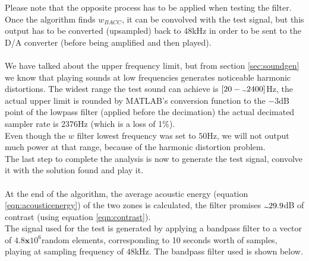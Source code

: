 Please note that the opposite process has to be applied when testing the filter. Once the algorithm finds $w_{BACC}$, it can be convolved with the test signal, but this output has to be converted (upsampled) back to $48$kHz in order to be sent to the D/A converter (before being amplified and then played).
\\
\\
We have talked about the upper frequency limit, but from section \ref{sec:soundgen} we know that playing sounds at low frequencies generates noticeable harmonic distortions. The widest range the test sound can achieve is $[20-\tld 2400]$Hz, the actual upper limit is rounded by MATLAB's conversion function to the $-3$dB point of the lowpass filter (applied before the decimation) the actual decimated sampler rate is $2376$Hz (which is a loss of 1\%).
\\
Even though the $w$ filter lowest frequency was set to $50$Hz, we will not output much power at that range, because of the harmonic distortion problem.
\\
The last step to complete the analysis is now to generate the test signal, convolve it with the solution found and play it.
\\
\\
At the end of the algorithm, the average acoustic energy (equation \ref{eqn:acousticenergy}) of the two zones is calculated, the filter promises $\tld 29.9$dB of contrast (using equation \ref{eqn:contrast}).
\\
The signal used for the test is generated by applying a bandpass filter to a vector of $4.8\textbf{x}10^6$random elements, corresponding to 10 seconds worth of samples, playing at sampling frequency of $48$kHz. The bandpass filter used is shown below.

